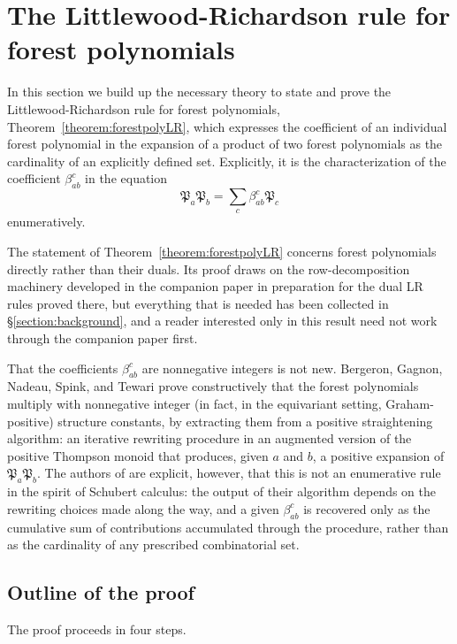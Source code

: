 \documentclass{amsart}
\theoremstyle{definition}
\theoremstyle{remark}
\numberwithin{equation}{subsection}
\newcommand{\forest}{\mathfrak{P}}
\begin{document}
\clearpage

\section{The Littlewood-Richardson rule for forest polynomials}\label{section:forestrule}

In this section we build up the necessary theory to state and prove the Littlewood-Richardson rule for forest polynomials, Theorem~\ref{theorem:forestpolyLR}, which expresses the coefficient of an individual forest polynomial in the expansion of a product of two forest polynomials as the cardinality of an explicitly defined set. Explicitly, it is the characterization of the coefficient $\beta_{ab}^c$ in the equation
$$\forest_a\forest_b = \sum_{c}\beta_{ab}^c\forest_c$$
enumeratively.

The statement of Theorem~\ref{theorem:forestpolyLR} concerns forest polynomials directly rather than their duals. Its proof draws on the row-decomposition machinery developed in the companion paper \cite{samuelbialgebra} in preparation for the dual LR rules proved there, but everything that is needed has been collected in \S\ref{section:background}, and a reader interested only in this result need not work through the companion paper first.

That the coefficients $\beta_{ab}^c$ are nonnegative integers is not new. Bergeron, Gagnon, Nadeau, Spink, and Tewari \cite{bergeron2025equivariant} prove constructively that the forest polynomials multiply with nonnegative integer (in fact, in the equivariant setting, Graham-positive) structure constants, by extracting them from a positive straightening algorithm: an iterative rewriting procedure in an augmented version of the positive Thompson monoid that produces, given $a$ and $b$, a positive expansion of $\forest_a \forest_b$. The authors of \cite{bergeron2025equivariant} are explicit, however, that this is not an enumerative rule in the spirit of Schubert calculus: the output of their algorithm depends on the rewriting choices made along the way, and a given $\beta_{ab}^c$ is recovered only as the cumulative sum of contributions accumulated through the procedure, rather than as the cardinality of any prescribed combinatorial set.


\subsection*{Outline of the proof}

The proof proceeds in four steps.
\end{document}
